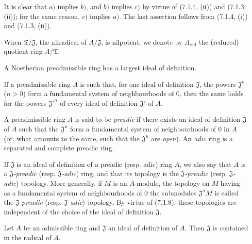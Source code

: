 It is clear that $a)$ implies $b)$, and $b)$ implies $c)$ by virtue of
(7.1.4, (ii)) and (7.1.3, (ii)); for the same reason, $c)$ implies $a)$. The
last assertion follows from (7.1.4, (i)) and (7.1.3, (ii)).

When $\mathfrak T/\mathfrak J$, the nilradical of $A/\mathfrak J$, is
nilpotent, we denote by $A_{\mathrm{red}}$ the (reduced) quotient ring
$A/\mathfrak T$.


\begin{corollary}[7.1.7]
\label{0.7.1.7}
A Noetherian preadmissible ring has a largest ideal of definition.
\end{corollary}

\begin{corollary}[7.1.8]
\label{0.7.1.8}
If a preadmissible ring $A$ is such that, for one ideal of definition
$\mathfrak J$, the powers $\mathfrak J^n$ ($n>0$) form a fundamental
system of neighbourhoods of $0$, then the same holds for the powers
${\mathfrak J'}^n$ of every ideal of definition $\mathfrak J'$ of $A$.
\end{corollary}

\begin{definition}[7.1.9]
\label{0.7.1.9}
A preadmissible ring $A$ is said to be \emph{preadic} if there exists an ideal of
definition $\mathfrak J$ of $A$ such that the $\mathfrak J^n$ form a
fundamental system of neighbourhoods of $0$ in $A$ \textup{(or, what amounts to the same, such that
the $\mathfrak J^n$ are \emph{open})}. An \emph{adic} ring is a separated and complete
preadic ring.
\end{definition}

If $\mathfrak J$ is an ideal of definition of a preadic (resp.
adic) ring $A$, we also say that $A$ is a
\emph{$\mathfrak J$-preadic} (resp. \emph{$\mathfrak J$-adic}) ring, and that its
topology is the \emph{$\mathfrak J$-preadic} (resp.
\emph{$\mathfrak J$-adic}) topology. More generally, if $M$ is an $A$-module, the
topology on $M$ having as a fundamental system of neighbourhoods of $0$ the
submodules $\mathfrak J^nM$ is called the
\emph{$\mathfrak J$-preadic} (resp. \emph{$\mathfrak J$-adic}) topology. By virtue
of (7.1.8), these topologies are independent of the choice of the ideal of definition
$\mathfrak J$.

\begin{proposition}[7.1.10]
\label{0.7.1.10}
Let $A$ be an admissible ring and $\mathfrak J$ an ideal of definition of $A$.
Then $\mathfrak J$ is contained in the radical of $A$.
\end{proposition}

